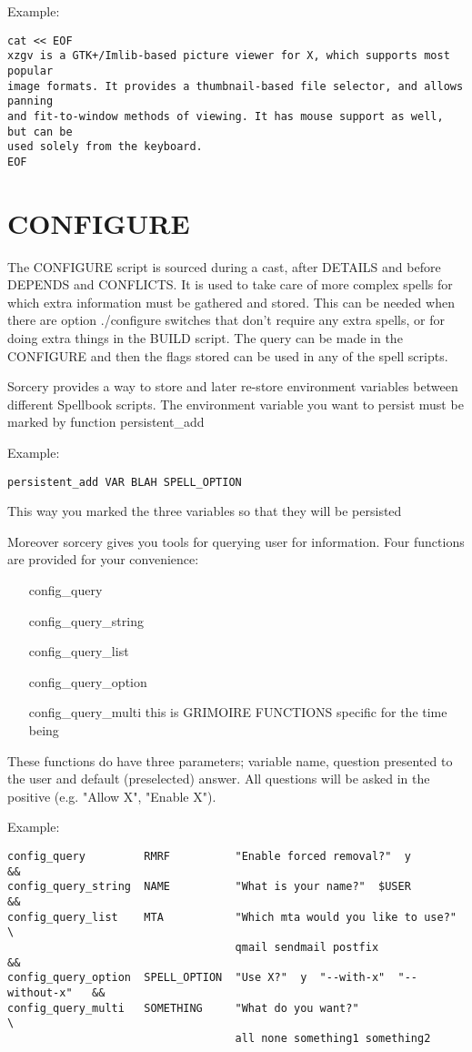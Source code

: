 \documentclass[a4paper,10pt]{book}
\begin{document}
Example:
\begin{verbatim}
cat << EOF
xzgv is a GTK+/Imlib-based picture viewer for X, which supports most popular
image formats. It provides a thumbnail-based file selector, and allows panning
and fit-to-window methods of viewing. It has mouse support as well, but can be
used solely from the keyboard.
EOF
\end{verbatim}

\section{CONFIGURE}
The CONFIGURE script is sourced during a cast, after DETAILS and before DEPENDS
and CONFLICTS. It is used to take care of more complex spells for which extra
information must be gathered and stored. This can be needed when there are
option ./configure switches that don't require any extra spells, or for doing
extra things in the BUILD script. The query can be made in the CONFIGURE and
then the flags stored can be used in any of the spell scripts.

Sorcery provides a way to store and later re-store environment variables
between different Spellbook scripts. The environment variable you want to
persist must be marked by function persistent\_add

Example:
\begin{verbatim}
persistent_add VAR BLAH SPELL_OPTION
\end{verbatim}

This way you marked the three variables so that they will be persisted

Moreover sorcery gives you tools for querying user for information. Four
functions are provided for your convenience:
\begin{itemize}
\item[config\_query]
\item[config\_query\_string]
\item[config\_query\_list]
\item[config\_query\_option]
\item[config\_query\_multi]
this is GRIMOIRE FUNCTIONS specific for the time being
\end{itemize}

These functions do have three parameters; variable name, question presented to
the user and default (preselected) answer. All questions will be asked in the
positive (e.g. "Allow X", "Enable X").

Example:
\begin{verbatim}
config_query         RMRF          "Enable forced removal?"  y              &&
config_query_string  NAME          "What is your name?"  $USER              &&
config_query_list    MTA           "Which mta would you like to use?"       \
                                   qmail sendmail postfix                   &&
config_query_option  SPELL_OPTION  "Use X?"  y  "--with-x"  "--without-x"   &&
config_query_multi   SOMETHING     "What do you want?"                      \
                                   all none something1 something2
\end{verbatim}
\end{document}
